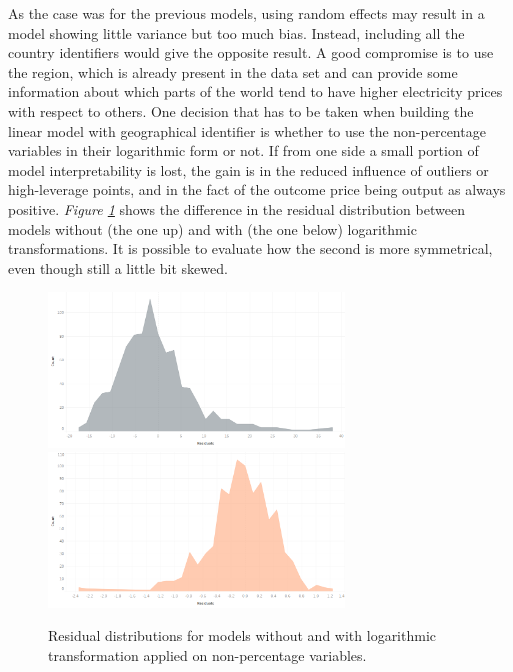 \documentclass[a4paper,12pt]{book}
\begin{document}
As the case was for the previous models, using random effects may result in a model showing little variance but too much bias. Instead, including all the country identifiers would give the opposite result. A good compromise is to use the region, which is already present in the data set and can provide some information about which parts of the world tend to have higher electricity prices with respect to others. One decision that has to be taken when building the linear model with geographical identifier is whether to use the non-percentage variables in their logarithmic form or not. If from one side a small portion of model interpretability is lost, the gain is in the reduced influence of outliers or high-leverage points, and in the fact of the outcome price being output as always positive. \textit{Figure \ref{fig:rez}} shows the difference in the residual distribution between models without (the one up) and with (the one below) logarithmic transformations. It is possible to evaluate how the second is more symmetrical, even though still a little bit skewed.

\begin{figure}[tb]
\begin{center}
\captionsetup{justification=centering}
\includegraphics[width=0.7\textwidth]{Images/residualz.png}
\includegraphics[width=0.7\textwidth]{Images/resdislog.png}
\caption{Residual distributions for models without and with logarithmic transformation applied on non-percentage variables.}
\label{fig:rez}
\end{center}
\end{figure}
\end{document}
